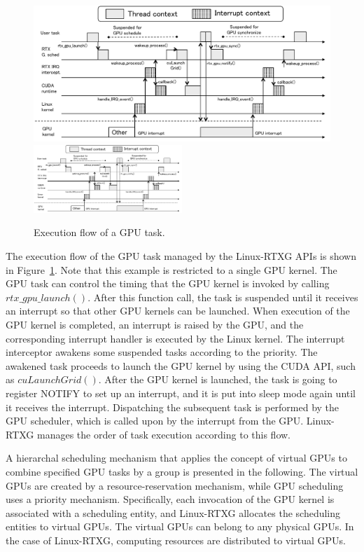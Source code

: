 \begin{figure}[!t]
\begin{center}
 \ifthesis
 \includegraphics[width=\textwidth]{img/gsched_controlflow.pdf}
 \else
 \includegraphics[width=0.5\textwidth]{img/gsched_controlflow.pdf}
 \fi
\caption{Execution flow of a GPU task.}
\vspace{-4mm}
\label{fig:controlflow}
\end{center}
\end{figure}

The execution flow of the GPU task managed by the Linux-RTXG APIs is shown in Figure~\ref{fig:controlflow}.
Note that this example is restricted to a single GPU kernel.
The GPU task can control the timing that the GPU kernel is invoked by calling $rtx\_gpu\_launch()$.
After this function call, the task is suspended until it receives an interrupt so that other GPU kernels can be launched.
When execution of the GPU kernel is completed, an interrupt is raised by the GPU, and the corresponding interrupt handler is executed by the Linux kernel.
The interrupt interceptor awakens some suspended tasks according to the priority.
The awakened task proceeds to launch the GPU kernel by using the CUDA API, such as $cuLaunchGrid()$.
After the GPU kernel is launched, the task is going to register NOTIFY to set up an interrupt, and it is put into sleep mode again until it receives the interrupt.
Dispatching the subsequent task is performed by the GPU scheduler, which is called upon by the interrupt from the GPU.
Linux-RTXG manages the order of task execution according to this flow.


A hierarchal scheduling mechanism that applies the concept of virtual GPUs to combine specified GPU tasks by a group is presented in the following.
The virtual GPUs are created by a resource-reservation mechanism, while GPU scheduling uses a priority mechanism.
Specifically, each invocation of the GPU kernel is associated with a scheduling entity, and Linux-RTXG allocates the scheduling entities to virtual GPUs.
The virtual GPUs can belong to any physical GPUs.
In the case of Linux-RTXG, computing resources are distributed to virtual GPUs.

